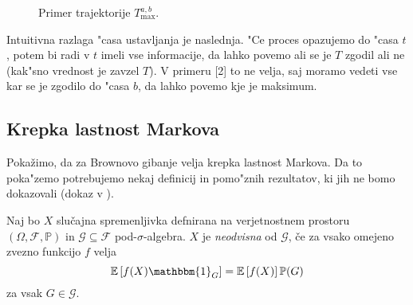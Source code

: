 \documentclass[twoside,11pt]{article}
\begin{document}
\begin{figure}[h]
    \centering
    \caption{Primer trajektorije $T^{a,b}_{\max}$.}
    \label{fig:slika4}
\end{figure}

Intuitivna razlaga "casa ustavljanja je naslednja. "Ce proces opazujemo do "casa $t$, potem bi radi v $t$ imeli vse informacije, da lahko povemo
ali se je $T$ zgodil ali ne (kak"sno vrednost je zavzel $T$). V primeru [2] to ne velja, saj moramo vedeti vse kar se je zgodilo do "casa $b$, da lahko povemo kje je maksimum. 

\subsection{Krepka lastnost Markova}
Pokažimo, da za Brownovo gibanje velja krepka lastnost Markova. Da to poka"zemo potrebujemo nekaj definicij in pomo"znih rezultatov, ki jih ne bomo dokazovali (dokaz v \cite{3}).

%

\begin{definicija}
    Naj bo $X$ slučajna spremenljivka defnirana na verjetnostnem prostoru $(\Omega, \mathcal{F}, \mathbb{P})$
    in $\mathcal{G} \subseteq \mathcal{F}$ pod-$\sigma$-algebra. $X$ je \textit{neodvisna}
    od $\mathcal{G}$, če za vsako omejeno zvezno funkcijo $f$ velja
    $$
        \mathbb{E}\left[f(X)\mathbbm{1}_G\right] = \mathbb{E}\left[f(X)\right]\mathbb{P}(G)
    $$
    za vsak $G \in \mathcal{G}$.
\end{definicija}
\end{document}

